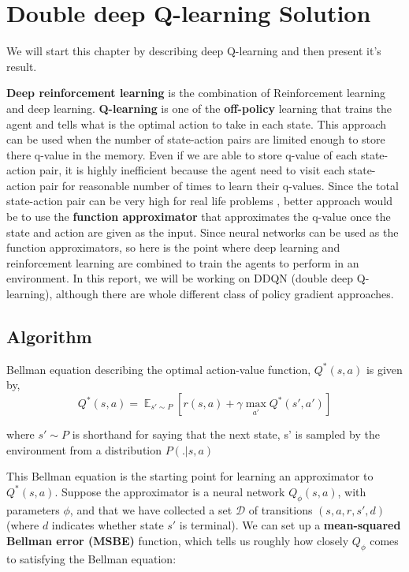\chapter{Double deep Q-learning Solution}

We will start this chapter by describing deep Q-learning and then present it's result.

\textbf{Deep reinforcement learning} is the combination of Reinforcement learning and
deep learning. \textbf{Q-learning} is one of the \textbf{off-policy} learning that trains the agent
and tells what is the optimal action to take in each state. This approach can be used
when the number of state-action pairs are limited enough to store there q-value in
the memory. Even if we are able to store q-value of each state-action pair, it is
highly inefficient because the agent need to visit each state-action pair for
reasonable number of times to learn their q-values. Since the total state-action pair
can be very high for real life problems , better approach would be to use the
\textbf{function approximator\cite{BOOK:1}} that approximates the q-value once the state and action are
given as the input. Since neural networks can be used as the function
approximators, so here is the point where deep learning and reinforcement
learning are combined to train the agents to perform in an environment.
In this report, we will be working on DDQN (double deep Q-learning), although there are
whole different class of policy gradient approaches.

\section {Algorithm}

Bellman equation describing the optimal action-value function, $Q^*(s,a)$ is given by,
$$Q^*(s,a) = \mathop{\mathbb{E}}_{s' \sim P}[r(s,a) + \gamma \mathop{\max}_{a'}Q^*(s',a') ]$$

where $s' \sim P$ is shorthand for saying that the next state, s' is sampled by the environment from a 
distribution $P(.|s,a)$

\vspace{\baselineskip}
This Bellman equation is the starting point for learning an approximator to $Q^*(s,a)$. 
Suppose the approximator is a neural network $Q_{\phi}(s,a)$, with parameters $\phi$, 
and that we have collected a set ${\mathcal D}$ of transitions $(s,a,r,s',d)$ (where $d$ 
indicates whether state $s'$ is terminal). We can set up a \textbf{mean-squared Bellman error (MSBE)} function,
 which tells us roughly how closely $Q_{\phi}$ comes to satisfying the Bellman equation:

